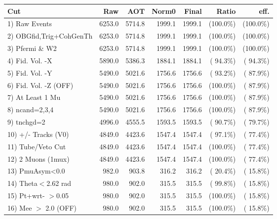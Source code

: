  \begin{table}[h!]\centering
 \begin{tabular}{||l||r|r|r|r|r|r||}
 \hline
 \hline
 Cut & Raw & AOT & Norm0 & Final & Ratio & eff.       \\
 \hline
  1) Raw Events           &       6253.0 &       5714.8 &       1999.1 &       1999.1 & (100.0\%) & (100.0\%) \\
  2) OBGfid,Trig+CohGenTh &       6253.0 &       5714.8 &       1999.1 &       1999.1 & (100.0\%) & (100.0\%) \\
  3) Pfermi \& W2         &       6253.0 &       5714.8 &       1999.1 &       1999.1 & (100.0\%) & (100.0\%) \\
  4) Fid. Vol. -X         &       5890.0 &       5386.3 &       1884.1 &       1884.1 & ( 94.3\%) & ( 94.3\%) \\
  5) Fid. Vol. -Y         &       5490.0 &       5021.6 &       1756.6 &       1756.6 & ( 93.2\%) & ( 87.9\%) \\
  6) Fid. Vol. -Z (OFF)   &       5490.0 &       5021.6 &       1756.6 &       1756.6 & (100.0\%) & ( 87.9\%) \\
  7) At Least 1 Mu        &       5490.0 &       5021.6 &       1756.6 &       1756.6 & (100.0\%) & ( 87.9\%) \\
  8) ncand=2,3,4          &       5490.0 &       5021.6 &       1756.6 &       1756.6 & (100.0\%) & ( 87.9\%) \\
  9) tnchgd=2             &       4996.0 &       4555.5 &       1593.5 &       1593.5 & ( 90.7\%) & ( 79.7\%) \\
 10) +/- Tracks (V0)      &       4849.0 &       4423.6 &       1547.4 &       1547.4 & ( 97.1\%) & ( 77.4\%) \\
 11) Tube/Veto Cut        &       4849.0 &       4423.6 &       1547.4 &       1547.4 & (100.0\%) & ( 77.4\%) \\
 12) 2 Muons (1mux)       &       4849.0 &       4423.6 &       1547.4 &       1547.4 & (100.0\%) & ( 77.4\%) \\
 13) PmuAsym<0.0          &        982.0 &        903.8 &        316.2 &        316.2 & ( 20.4\%) & ( 15.8\%) \\
 14) Theta$<$2.62 rad     &        980.0 &        902.0 &        315.5 &        315.5 & ( 99.8\%) & ( 15.8\%) \\
 15) Pt+wrt- $>$0.05      &        980.0 &        902.0 &        315.5 &        315.5 & (100.0\%) & ( 15.8\%) \\
 16) Mee $>$ 2.0  (OFF)   &        980.0 &        902.0 &        315.5 &        315.5 & (100.0\%) & ( 15.8\%) \\

\end{tabular}
\end{table}
